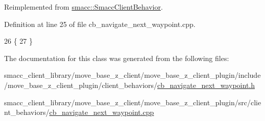 Reimplemented from \hyperlink{classsmacc_1_1SmaccClientBehavior_ac0cd72d42bd00425362a97c9803ecce5}{smacc\+::\+Smacc\+Client\+Behavior}.



Definition at line 25 of file cb\+\_\+navigate\+\_\+next\+\_\+waypoint.\+cpp.


\begin{DoxyCode}
26     \{
27     \}
\end{DoxyCode}


The documentation for this class was generated from the following files\+:\begin{DoxyCompactItemize}
\item 
smacc\+\_\+client\+\_\+library/move\+\_\+base\+\_\+z\+\_\+client/move\+\_\+base\+\_\+z\+\_\+client\+\_\+plugin/include/move\+\_\+base\+\_\+z\+\_\+client\+\_\+plugin/client\+\_\+behaviors/\hyperlink{cb__navigate__next__waypoint_8h}{cb\+\_\+navigate\+\_\+next\+\_\+waypoint.\+h}\item 
smacc\+\_\+client\+\_\+library/move\+\_\+base\+\_\+z\+\_\+client/move\+\_\+base\+\_\+z\+\_\+client\+\_\+plugin/src/client\+\_\+behaviors/\hyperlink{cb__navigate__next__waypoint_8cpp}{cb\+\_\+navigate\+\_\+next\+\_\+waypoint.\+cpp}\end{DoxyCompactItemize}
